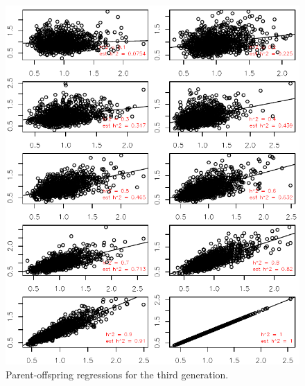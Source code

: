 \documentclass[12pt,reqno,final,pdftex]{amsart}\usepackage[]{graphicx}\usepackage[]{color}
\newenvironment{knitrout}{}{} %
\theoremstyle{plain}
\numberwithin{equation}{part}
\begin{document}
\begin{knitrout}\scriptsize
{}\color{fgcolor}\begin{figure}

\includegraphics[width=\linewidth]{figure/unnamed-chunk-4-1} \hfill{}

\caption[Parent-offspring regressions for the third generation]{Parent-offspring regressions for the third generation.}\label{fig:unnamed-chunk-4}
\end{figure}


\end{knitrout}

\newpage
\end{document}
